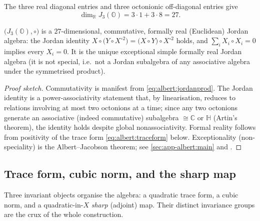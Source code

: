 The three real diagonal entries and three octonionic off-diagonal
entries give
\begin{equation}\label{eq:albert:dim}
  \dim_{\mathbb{R}} J_{3}(\mathbb{O})
  = 3\cdot 1 + 3\cdot 8 = 27 .
\end{equation}

\begin{theorem}\label{thm:albert:formallyreal}
$\bigl(J_{3}(\mathbb{O}),\circ\bigr)$ is a $27$-dimensional, commutative,
formally real (Euclidean) Jordan algebra: the Jordan identity
$X\circ\bigl(Y\circ X^{\circ 2}\bigr)=\bigl(X\circ Y\bigr)\circ X^{\circ 2}$
holds, and $\sum_{i} X_{i}\circ X_{i}=0$ implies every $X_{i}=0$. It is
the unique exceptional simple formally real Jordan algebra (it is not
special, i.e.\ not a Jordan subalgebra of any associative algebra under
the symmetrised product).
\end{theorem}

\begin{proof}[Proof sketch]
Commutativity is manifest from \eqref{eq:albert:jordanprod}. The Jordan
identity is a power-associativity statement that, by linearisation,
reduces to relations involving at most two octonions at a time; since any
two octonions generate an associative (indeed commutative) subalgebra
$\cong\mathbb{C}$ or $\mathbb{H}$ (Artin's theorem), the identity holds
despite global nonassociativity. Formal reality follows from positivity
of the trace form \eqref{eq:albert:traceform} below. Exceptionality
(non-speciality) is the Albert--Jacobson theorem; see
\autoref{sec:app-albert:main} and \cite{Albert:1934,Jacobson:1968,McCrimmon:2004}.
\end{proof}

\subsection{Trace form, cubic norm, and the sharp map}
\label{sec:albert:invariants}

Three invariant objects organise the algebra: a quadratic trace form, a
cubic norm, and a quadratic-in-$X$ \emph{sharp} (adjoint) map. Their
distinct invariance groups are the crux of the whole construction.

